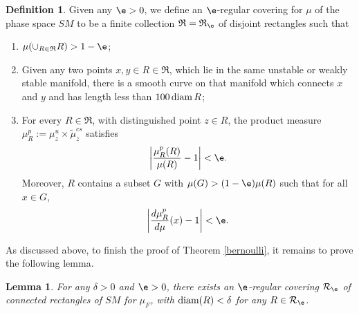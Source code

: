 \documentclass[11pt]{amsart}
\newtheorem{lemma}[theorem]{Lemma}
\theoremstyle{definition}
\newtheorem{definition}[theorem]{Definition}
\def\diam{\mathop{\hbox{{\rm diam}}}}
\def\diam{\mathop{\hbox{{\rm diam}}}}
\def\d{\delta}   %
\begin{document}
\begin{definition} \label{coveringdef}
Given any $\e> 0$, we define an $\e$-regular covering for $\mu$ of the
phase space $SM$ to be a finite collection $\mathfrak{R}=\mathfrak{R}_\e$ of disjoint rectangles such that
\begin{enumerate}
  \item $\mu(\cup_{R\in \mathfrak{R}}R) > 1-\e$;
  \item Given any two points $x, y\in R \in \mathfrak{R}$, which lie in the same unstable or weakly
stable manifold, there is a smooth curve on that manifold which connects $x$
and $y$ and has length less than $100\diam R$;
  \item For every $R\in \mathfrak{R}$, with distinguished point $z\in R$, the product measure $\mu^p_R:=\mu^u_z\times \tilde\mu^{cs}_z$ satisfies
$$\left|\frac{\mu^p_R(R)}{\mu(R)}-1\right| <\e.$$
Moreover, $R$ contains a subset $G$ with $\mu(G) > (1-\e)\mu(R)$ such that for all $x\in G$,
$$\left|\frac{d\mu^p_R}{d\mu}(x)-1\right| <\e.$$
\end{enumerate}
\end{definition}

As discussed above, to finish the proof of Theorem \ref{bernoulli}, it remains to prove the following lemma.
\begin{lemma}\label{covering}
For any $\d>0$ and $\e>0$, there exists an $\e$-regular covering $\mathcal{R}_{\e}$ of connected rectangles of $SM$ for $\mu_F$, with $\diam(R)<\d$ for any $R\in \mathcal{R}_{\e}$.
\end{lemma}
\end{document}
